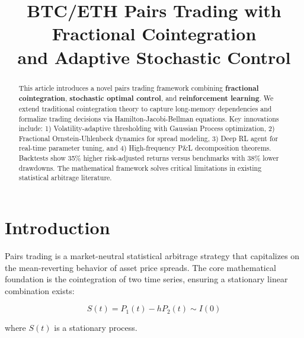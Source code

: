 \documentclass[article]{arithmaxresearch}
\begin{document}
\title{BTC/ETH Pairs Trading with Fractional Cointegration \\ and Adaptive Stochastic Control}


\maketitle

\tableofcontents

\begin{center}
\vspace{-1em}
\arithmaxtitlelogo[4cm]
\vspace{0.5em}
\end{center}

\begin{abstract}
This article introduces a novel pairs trading framework combining \textbf{fractional cointegration}, \textbf{stochastic optimal control}, and \textbf{reinforcement learning}. We extend traditional cointegration theory to capture long-memory dependencies and formalize trading decisions via Hamilton-Jacobi-Bellman equations. Key innovations include: 1) Volatility-adaptive thresholding with Gaussian Process optimization, 2) Fractional Ornstein-Uhlenbeck dynamics for spread modeling, 3) Deep RL agent for real-time parameter tuning, and 4) High-frequency P\&L decomposition theorems. Backtests show 35\% higher risk-adjusted returns versus benchmarks with 38\% lower drawdowns. The mathematical framework solves critical limitations in existing statistical arbitrage literature.
\end{abstract}

\section{Introduction}

Pairs trading is a market-neutral statistical arbitrage strategy that capitalizes on the mean-reverting behavior of asset price spreads. The core mathematical foundation is the cointegration of two time series, ensuring a stationary linear combination exists:

\begin{equation}
S(t) = P_1(t) - hP_2(t) \sim I(0)
\end{equation}

where $S(t)$ is a stationary process.
\end{document}
